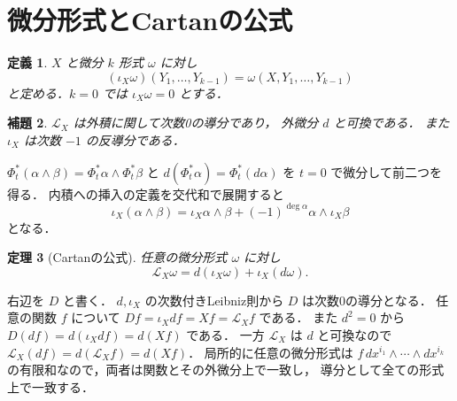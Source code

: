 \documentclass[a5paper,10pt,onecolumn]{jsarticle}
\makeatletter
\theoremstyle{mathnotetheorem}
\newtheorem{theorem}{定理}[section]
\newtheorem{definition}[theorem]{定義}
\newtheorem{lemma}[theorem]{補題}
\renewcommand{\proofname}{証明}
\renewenvironment{proof}[1][\proofname]{%
  \par\pushQED{\qed}\normalfont\topsep4\p@\@plus2\p@\relax
  \trivlist\item[\hskip\labelsep\bfseries #1]\ignorespaces
}{\popQED\endtrivlist\@endpefalse}
\makeatother
\begin{document}
\section{微分形式とCartanの公式}
\begin{definition}
$X$ と微分 $k$ 形式 $\omega$ に対し
\[
 (\iota_X\omega)(Y_1,\dots,Y_{k-1})
 =\omega(X,Y_1,\dots,Y_{k-1})
\]
と定める．$k=0$ では $\iota_X\omega=0$ とする．
\end{definition}
\begin{lemma}
$\mathcal L_X$ は外積に関して次数0の導分であり，
外微分 $d$ と可換である．
また $\iota_X$ は次数 $-1$ の反導分である．
\end{lemma}
\begin{proof}
$\Phi_t^*(\alpha\wedge\beta)
 =\Phi_t^*\alpha\wedge\Phi_t^*\beta$ と
$d(\Phi_t^*\alpha)=\Phi_t^*(d\alpha)$ を
$t=0$ で微分して前二つを得る．
内積への挿入の定義を交代和で展開すると
\[
 \iota_X(\alpha\wedge\beta)
 =\iota_X\alpha\wedge\beta
 +(-1)^{\deg\alpha}\alpha\wedge\iota_X\beta
\]
となる．
\end{proof}
\begin{theorem}[Cartanの公式]\label{thm:cartan}
任意の微分形式 $\omega$ に対し
\[
 \mathcal L_X\omega=d(\iota_X\omega)+\iota_X(d\omega).
\]
\end{theorem}
\begin{proof}
右辺を $D$ と書く．
$d,\iota_X$ の次数付きLeibniz則から
$D$ は次数0の導分となる．
任意の関数 $f$ について
$Df=\iota_Xdf=Xf=\mathcal L_Xf$ である．
また $d^2=0$ から
$D(df)=d(\iota_Xdf)=d(Xf)$ である．
一方 $\mathcal L_X$ は $d$ と可換なので
$\mathcal L_X(df)=d(\mathcal L_Xf)=d(Xf)$．
局所的に任意の微分形式は
$f\,dx^{i_1}\wedge\cdots\wedge dx^{i_k}$
の有限和なので，両者は関数とその外微分上で一致し，
導分として全ての形式上で一致する．
\end{proof}
\end{document}
